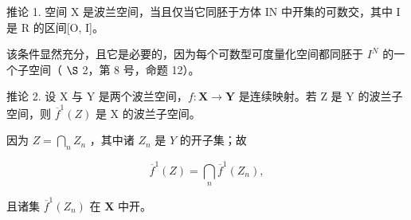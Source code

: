 推论 1. 空间 X 是波兰空间，当且仅当它同胚于方体 IN 中开集的可数交，其中 I 是 R 的区间{[}O, I{]}。

该条件显然充分，且它是必要的，因为每个可数型可度量化空间都同胚于 \(I^{N}\) 的一个子空间（ \(\S\) 2，第 8 号，命题 12）。

推论 2. 设 X 与 Y 是两个波兰空间，\(f: \mathbf{X} \to \mathbf{Y}\) 是连续映射。若 Z 是 Y 的波兰子空间，则 \(\overline{f}^{1}(Z)\) 是 X 的波兰子空间。

因为 \(Z = \bigcap_{n} Z_n\) ，其中诸 \(Z_n\) 是 \(Y\) 的开子集；故

\[
\overline {{{f}}} ^ {1} (Z) = \bigcap_ {n} \overline {{{f}}} ^ {1} (Z _ {n}),
\]

且诸集 \(\overline{f}^1 (Z_n)\) 在 \(\mathbf{X}\) 中开。

